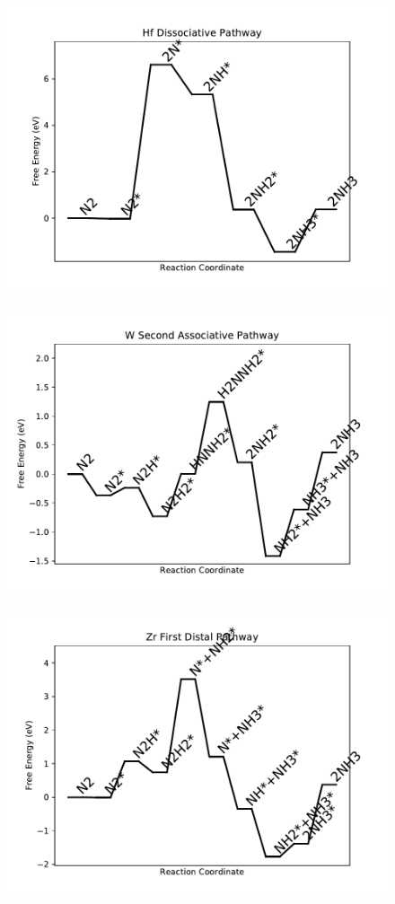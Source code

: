 \begin{figure}
\centering
\includegraphics[width=0.8\linewidth]{data/plots/Hf_dissociative.pdf}
\end{figure}

\begin{figure}
\centering
\includegraphics[width=0.8\linewidth]{data/plots/W_associative_2.pdf}
\end{figure}

\begin{figure}
\centering
\includegraphics[width=0.8\linewidth]{data/plots/Zr_distal_1.pdf}
\end{figure}

